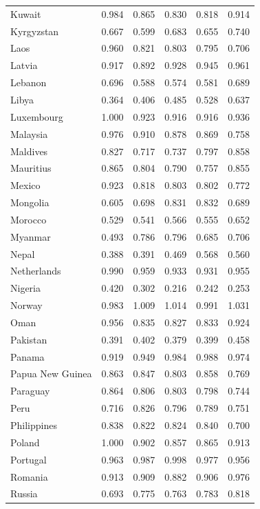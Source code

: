 \documentclass[runningheads]{llncs}
\begin{document}
{\begin{longtable}{p{}rrrrr}
Kuwait & 0.984 & 0.865 & 0.830 & 0.818 & 0.914 \\
Kyrgyzstan & 0.667 & 0.599 & 0.683 & 0.655 & 0.740 \\
Laos & 0.960 & 0.821 & 0.803 & 0.795 & 0.706 \\
Latvia & 0.917 & 0.892 & 0.928 & 0.945 & 0.961 \\
Lebanon & 0.696 & 0.588 & 0.574 & 0.581 & 0.689 \\
Libya & 0.364 & 0.406 & 0.485 & 0.528 & 0.637 \\
Luxembourg & 1.000 & 0.923 & 0.916 & 0.916 & 0.936 \\
Malaysia & 0.976 & 0.910 & 0.878 & 0.869 & 0.758 \\
Maldives & 0.827 & 0.717 & 0.737 & 0.797 & 0.858 \\
Mauritius & 0.865 & 0.804 & 0.790 & 0.757 & 0.855 \\
Mexico & 0.923 & 0.818 & 0.803 & 0.802 & 0.772 \\
Mongolia & 0.605 & 0.698 & 0.831 & 0.832 & 0.689 \\
Morocco & 0.529 & 0.541 & 0.566 & 0.555 & 0.652 \\
Myanmar & 0.493 & 0.786 & 0.796 & 0.685 & 0.706 \\
Nepal & 0.388 & 0.391 & 0.469 & 0.568 & 0.560 \\
Netherlands & 0.990 & 0.959 & 0.933 & 0.931 & 0.955 \\
Nigeria & 0.420 & 0.302 & 0.216 & 0.242 & 0.253 \\
Norway & 0.983 & 1.009 & 1.014 & 0.991 & 1.031 \\
Oman & 0.956 & 0.835 & 0.827 & 0.833 & 0.924 \\
Pakistan & 0.391 & 0.402 & 0.379 & 0.399 & 0.458 \\
Panama & 0.919 & 0.949 & 0.984 & 0.988 & 0.974 \\
Papua New Guinea & 0.863 & 0.847 & 0.803 & 0.858 & 0.769 \\
Paraguay & 0.864 & 0.806 & 0.803 & 0.798 & 0.744 \\
Peru & 0.716 & 0.826 & 0.796 & 0.789 & 0.751 \\
Philippines & 0.838 & 0.822 & 0.824 & 0.840 & 0.700 \\
Poland & 1.000 & 0.902 & 0.857 & 0.865 & 0.913 \\
Portugal & 0.963 & 0.987 & 0.998 & 0.977 & 0.956 \\
Romania & 0.913 & 0.909 & 0.882 & 0.906 & 0.976 \\
Russia & 0.693 & 0.775 & 0.763 & 0.783 & 0.818 \\

\end{longtable}}
\end{document}
